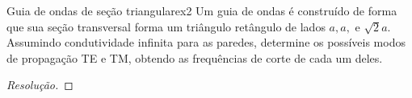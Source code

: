 \begin{exercício}{Guia de ondas de seção triangular}{ex2}
    Um guia de ondas é construído de forma que sua seção transversal forma um triângulo retângulo de lados \(a, a,\) e \(\sqrt{2}a\). Assumindo condutividade infinita para as paredes, determine os possíveis modos de propagação TE e TM, obtendo as frequências de corte de cada um deles.
\end{exercício}
\begin{proof}[Resolução]
    
\end{proof}
